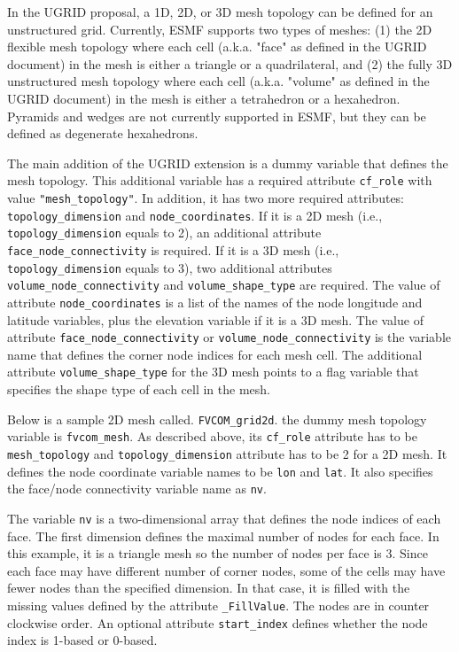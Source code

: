 In the UGRID proposal, a 1D, 2D, or 3D mesh topology can be defined for an unstructured grid.  Currently, ESMF
supports two types of meshes: (1) the 2D flexible mesh topology where each cell (a.k.a. "face" as defined in the UGRID document) in the mesh is either a triangle or a quadrilateral, and (2) the fully 3D unstructured mesh topology where each cell (a.k.a. "volume" as defined in the UGRID document) in the mesh
is either a tetrahedron or a hexahedron.  Pyramids and wedges are not currently supported in ESMF, but they
can be defined as degenerate hexahedrons.   

The main addition of the UGRID extension is a dummy variable that defines the mesh
topology.  This additional variable has a required attribute {\tt cf\_role} with value {\tt "mesh\_topology"}.  In addition, it has two more required attributes: {\tt topology\_dimension}
and {\tt node\_coordinates}.  If it is a 2D mesh (i.e., {\tt topology\_dimension} equals to 2), an additional attribute
{\tt face\_node\_connectivity} is required.  If it is a 3D mesh (i.e., {\tt topology\_dimension} equals to 3), two additional attributes {\tt volume\_node\_connectivity} and {\tt volume\_shape\_type} are required.
The value of attribute {\tt node\_coordinates} is a list of the names of the node longitude and latitude variables,
plus the elevation variable if it is a 3D mesh.
The value of attribute {\tt face\_node\_connectivity} or {\tt volume\_node\_connectivity} is the variable name that defines the corner node indices for each mesh cell. The additional attribute {\tt volume\_shape\_type} for the
3D mesh points to a flag variable that specifies the shape type of each cell in the mesh.

Below is a sample 2D mesh called. {\tt FVCOM\_grid2d}. the dummy mesh topology variable is {\tt fvcom\_mesh}.  As described above, its {\tt cf\_role} attribute has to be {\tt mesh\_topology}
and {\tt topology\_dimension} attribute has to be 2 for a 2D mesh.  It defines
the node coordinate variable names to be {\tt lon} and {\tt lat}.  It also specifies the face/node connectivity variable name as {\tt nv}.

The variable {\tt nv} is a two-dimensional array that defines the node indices of each face. The first dimension
defines the maximal number of nodes for each face. In this example, it is a
triangle mesh so the number of nodes per face is 3.  Since each face may have different number of corner nodes,
some of the cells may have fewer nodes than the specified dimension. In that case, it is filled with the
missing values defined by the attribute {\tt \_FillValue}.  The nodes are in counter clockwise order.  An optional attribute
{\tt start\_index} defines whether the node index is 1-based or 0-based.

